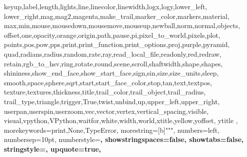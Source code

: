 {{		keyup,label,length,lights,line,linecolor,linewidth,logx,logy,lower_left,%
		lower_right,mag,mag2,magenta,make_trail,marker_color,markers,material,%
		max,min,mouse,mousedown,mousemove,mouseup,newball,norm,normal,objects,%
		offset,one,opacity,orange,origin,path,pause,pi,pixel_to_world,pixels,plot,%
		points,pos,pow,pps,print,print_function,print_options,proj,purple,pyramid,%
		quad,radians,radius,random,rate,ray,read_local_file,readonly,red,redraw,%
		retain,rgb_to_hsv,ring,rotate,round,scene,scroll,shaftwidth,shape,shapes,%
		shininess,show_end_face,show_start_face,sign,sin,size,size_units,sleep,%
		smooth,space,sphere,sqrt,start,start_face_color,stop,tan,text,textpos,%
		texture,textures,thickness,title,trail_color,trail_object,trail_radius,%
		trail_type,triangle,trigger,True,twist,unbind,up,upper_left,upper_right,%
		userpan,userspin,userzoom,vec,vector,vertex,vertical_spacing,visible,%
		visual,vpython,VPython,waitfor,white,width,world,xtitle,yellow,yoffset,%
		ytitle%
	},%
	morekeywords={print,None,TypeError},%
	morestring=[b]{"""},%
	numbers=left,%
	numbersep=10pt,%
	numberstyle=\bfseries\tiny,%
	showstringspaces=false,%
	showtabs=false,%
	stringstyle=\color{gsgreen},%
	upquote=true,%
}%

\newcommand*{\pythonline}[1]{\Colorbox{gsbggray}{\lstinline[style=vpython]{#1}}}

\usepackage[extrafootnotefeatures]{xepersian}


\setcounter{tocdepth}{3}
\setcounter{secnumdepth}{3}

